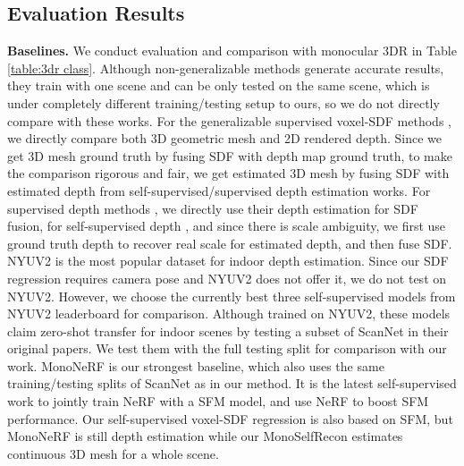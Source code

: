 \subsection{Evaluation Results}
\noindent
\textbf{Baselines.} We conduct evaluation and comparison with monocular 3DR in Table \ref{table:3dr class}. Although non-generalizable methods\cite{neuralangelo,neuralwarp,neuris} generate accurate results, they train with one scene and can be only tested on the same scene, which is under completely different training/testing setup to ours, so we do not directly compare with these works. For the generalizable supervised voxel-SDF methods \cite{atlas,neucon}, we directly compare both 3D geometric mesh and 2D rendered depth. Since we get 3D mesh ground truth by fusing SDF with depth map ground truth, to make the comparison rigorous and fair, we get estimated 3D mesh by fusing SDF with estimated depth from self-supervised/supervised depth estimation works. For supervised depth methods \cite{mvdepthnet, gpmvs, dpsnet}, we directly use their depth estimation for SDF fusion, for self-supervised depth \cite{p2net, monoindoor, movingindoor, structdepth}, and since there is scale ambiguity, we first use ground truth depth to recover real scale for estimated depth, and then fuse SDF. NYUV2 is the most popular dataset for indoor depth estimation. Since our SDF regression requires camera pose and NYUV2 does not offer it, we do not test on NYUV2. However, we choose the currently best three self-supervised models \cite{distdepth, structdepth, p2net} from NYUV2 leaderboard for comparison. Although trained on NYUV2, these models claim zero-shot transfer for indoor scenes by testing a subset of ScanNet in their original papers. We test them with the full testing split for comparison with our work. MonoNeRF \cite{mononerf} is our strongest baseline, which also uses the same training/testing splits of ScanNet as in our method. It is the latest self-supervised work to jointly train NeRF with a SFM model, and use NeRF to boost SFM performance.  Our self-supervised voxel-SDF regression is also based on SFM, but MonoNeRF is still depth estimation while our MonoSelfRecon estimates continuous 3D mesh for a whole scene. 

